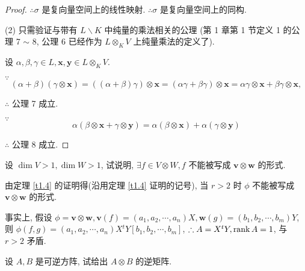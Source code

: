 \documentclass{ctexart}
\begin{document}
\begin{proof}
    $\therefore\sigma$ 是复向量空间上的线性映射. $\therefore\sigma$ 是复向量空间上的同构.

    (2) 只需验证与带有 $L\backslash K$ 中纯量的乘法相关的公理 (第 1 章第 1 节定义 1 的公理 7 $\sim$ 8, 公理 6 已经作为 $L\otimes_KV$ 上纯量乘法的定义了).

    设 $\alpha,\beta,\gamma\in L,\boldsymbol{x},\boldsymbol{y}\in L\otimes_KV$.

    $\because$
    \[(\alpha+\beta)(\gamma\otimes\boldsymbol{x})=((\alpha+\beta)\gamma)\otimes\boldsymbol{x}=(\alpha\gamma+\beta\gamma)\otimes\boldsymbol{x}=\alpha\gamma\otimes\boldsymbol{x}+\beta\gamma\otimes\boldsymbol{x},\]

    $\therefore$ 公理 7 成立.

    $\because$
    \[\alpha(\beta\otimes\boldsymbol{x}+\gamma\otimes\boldsymbol{y})=\alpha(\beta\otimes\boldsymbol{x})+\alpha(\gamma\otimes\boldsymbol{y})\]

    $\therefore$ 公理 8 成立.
\end{proof}
\begin{exercise}%
    设 $\dim V>1,\dim W>1$, 试说明, $\exists f\in V\otimes W,f$ 不能被写成 $\boldsymbol{v}\otimes\boldsymbol{w}$ 的形式.
\end{exercise}
\begin{solution}
    由定理 \ref{t1.4} 的证明得(沿用定理 \ref{t1.4} 证明的记号), 当 $r>2$ 时 $\phi$ 不能被写成 $\boldsymbol{v}\otimes\boldsymbol{w}$ 的形式.
    
    事实上, 假设 $\phi=\boldsymbol{v}\otimes\boldsymbol{w},\boldsymbol{v}(f)=(a_1,a_2,\cdots,a_n)X,\boldsymbol{w}(g)=(b_1,b_2,\cdots,b_m)Y$, 则 $\phi(f,g)=(a_1,a_2,\cdots,a_n)X{}^tY[b_1,b_2,\cdots,b_m]$, $\therefore A=X{}^tY,\operatorname{rank} A=1$, 与 $r>2$ 矛盾.
\end{solution}
\begin{exercise}%
    设 $A,B$ 是可逆方阵, 试给出 $A\otimes B$ 的逆矩阵.
\end{exercise}
\end{document}

